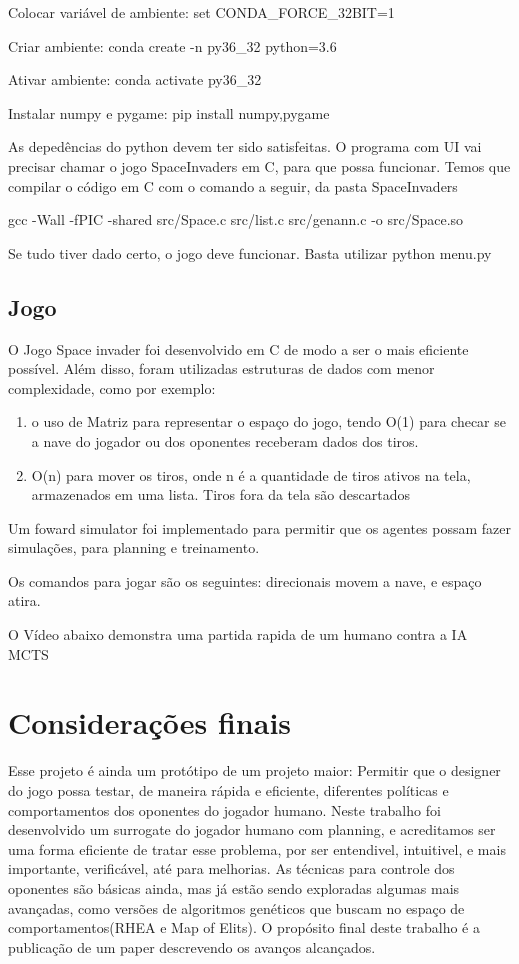 \documentclass[]{book}
\begin{document}
Colocar variável de ambiente: set CONDA\_FORCE\_32BIT=1

Criar ambiente: conda create -n py36\_32 python=3.6

Ativar ambiente: conda activate py36\_32

Instalar numpy e pygame: pip install numpy,pygame

As depedências do python devem ter sido satisfeitas. O programa com UI
vai precisar chamar o jogo SpaceInvaders em C, para que possa funcionar.
Temos que compilar o código em C com o comando a seguir, da pasta
SpaceInvaders

gcc -Wall -fPIC -shared src/Space.c src/list.c src/genann.c -o
src/Space.so

Se tudo tiver dado certo, o jogo deve funcionar. Basta utilizar python
menu.py

\section{Jogo}\label{jogo}

O Jogo Space invader foi desenvolvido em C de modo a ser o mais
eficiente possível. Além disso, foram utilizadas estruturas de dados com
menor complexidade, como por exemplo:

\begin{enumerate}
\def\labelenumi{\arabic{enumi}.}
\item
  o uso de Matriz para representar o espaço do jogo, tendo O(1) para
  checar se a nave do jogador ou dos oponentes receberam dados dos
  tiros.
\item
  O(n) para mover os tiros, onde n é a quantidade de tiros ativos na
  tela, armazenados em uma lista. Tiros fora da tela são descartados
\end{enumerate}

Um foward simulator foi implementado para permitir que os agentes possam
fazer simulações, para planning e treinamento.

Os comandos para jogar são os seguintes: direcionais movem a nave, e
espaço atira.

O Vídeo abaixo demonstra uma partida rapida de um humano contra a IA
MCTS

\chapter{Considerações finais}\label{considerauxe7uxf5es-finais}

Esse projeto é ainda um protótipo de um projeto maior: Permitir que o
designer do jogo possa testar, de maneira rápida e eficiente, diferentes
políticas e comportamentos dos oponentes do jogador humano. Neste
trabalho foi desenvolvido um surrogate do jogador humano com planning, e
acreditamos ser uma forma eficiente de tratar esse problema, por ser
entendivel, intuitivel, e mais importante, verificável, até para
melhorias. As técnicas para controle dos oponentes são básicas ainda,
mas já estão sendo exploradas algumas mais avançadas, como versões de
algoritmos genéticos que buscam no espaço de comportamentos(RHEA e Map
of Elits). O propósito final deste trabalho é a publicação de um paper
descrevendo os avanços alcançados.


\end{document}
